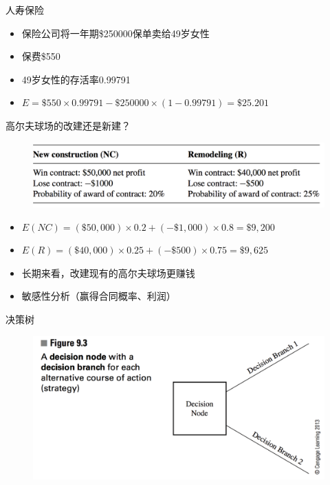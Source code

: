\documentclass[UTF8]{ctexbeamer}
\begin{document}
\begin{frame}{人寿保险}

  \begin{itemize}
  \item<1-> 保险公司将一年期\$250000保单卖给49岁女性
  \item<1-> 保费\$550
  \item<1-> 49岁女性的存活率0.99791
  \item<2-> $E = \$550 \times 0.99791 - \$250000 \times (1 - 0.99791) = \$25.201$
  \end{itemize}
  
\end{frame}

\begin{frame}{高尔夫球场的改建还是新建？}

  \begin{figure}
    \centering
    \includegraphics[width=\textwidth{}]{golf.png}
  \end{figure}
  
  \begin{itemize}
  \item<2-> $E(NC) = (\$50,000) \times 0.2 + (-\$1,000) \times 0.8 = \$9,200$
  \item<3-> $E(R) = (\$40,000) \times 0.25 + (-\$500) \times 0.75 = \$9,625$
  \item<4-> 长期来看，改建现有的高尔夫球场更赚钱
  \item<5-> 敏感性分析（赢得合同概率、利润）
  \end{itemize}
  
\end{frame}

\begin{frame}{决策树}
  
  \begin{figure}
    \centering
    \includegraphics[width=\textwidth{}]{9_3.png}
  \end{figure}
  
\end{frame}
\end{document}
